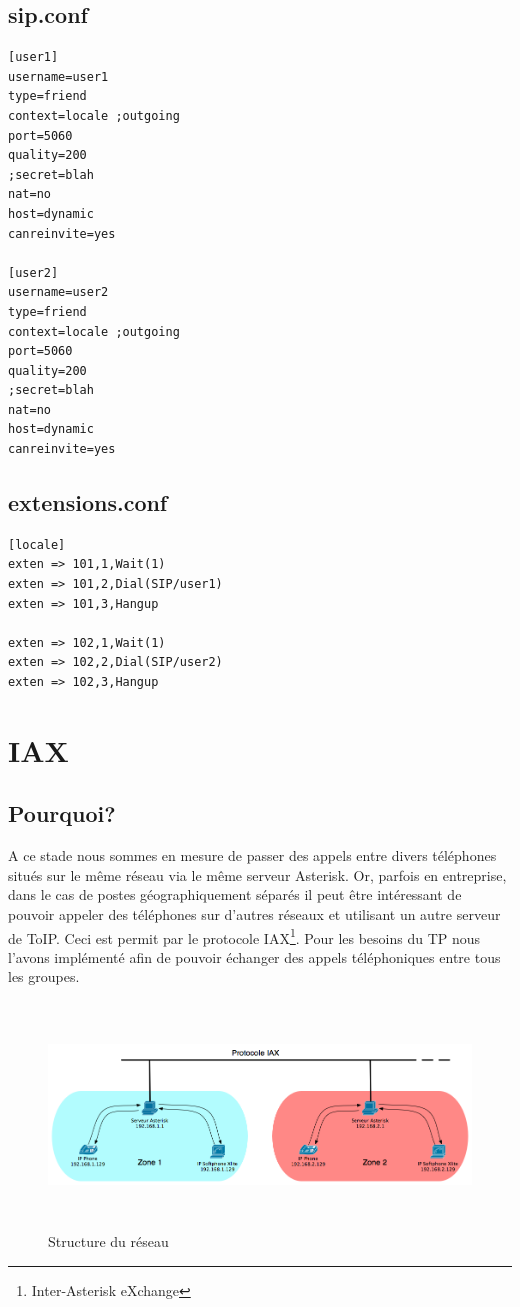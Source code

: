 \documentclass[12pt,a4paper,notitlepage]{article}
\begin{document}
\subsection{sip.conf}

\begin{lstlisting}[title=sip.conf v1]
[user1]
username=user1
type=friend
context=locale ;outgoing
port=5060
quality=200
;secret=blah
nat=no
host=dynamic
canreinvite=yes

[user2]
username=user2
type=friend
context=locale ;outgoing
port=5060
quality=200
;secret=blah
nat=no
host=dynamic
canreinvite=yes
\end{lstlisting}

\subsection{extensions.conf}

\begin{lstlisting}[title=Extensions.conf v1]
[locale]
exten => 101,1,Wait(1)
exten => 101,2,Dial(SIP/user1)
exten => 101,3,Hangup

exten => 102,1,Wait(1)
exten => 102,2,Dial(SIP/user2)
exten => 102,3,Hangup
\end{lstlisting}

\clearpage
\section{IAX} 
\subsection{Pourquoi?}
A ce stade nous sommes en mesure de passer des appels entre divers téléphones situés sur le même réseau via le même serveur Asterisk. Or, parfois en entreprise, dans le cas de postes géographiquement séparés il peut être intéressant de pouvoir appeler des téléphones sur d'autres réseaux et utilisant un autre serveur de ToIP. Ceci est permit par le protocole IAX\footnote{Inter-Asterisk eXchange}. Pour les besoins du TP nous l'avons implémenté afin de pouvoir échanger des appels téléphoniques entre tous les groupes.

\begin{figure}[!h]
\begin{center}
\includegraphics[height=6cm]{structure_reseau_IAX}
\caption{Structure du réseau}
\label{fig:da}
\end{center}
\end{figure}
\end{document}
